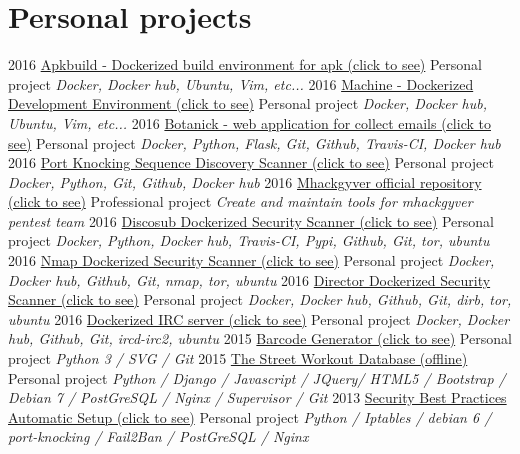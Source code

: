 \documentclass[]{friggeri-cv}
\begin{document}
\section{Personal projects}
\begin{entrylist}
  \entry
    {2016}
    {\href{https://github.com/gr0und-s3ct0r/apkbuild}{Apkbuild - Dockerized build environment for apk (click to see)}}
    {Personal project}
    {\emph{Docker, Docker hub, Ubuntu, Vim, etc...}}
  \entry
    {2016}
    {\href{https://github.com/4383/machine}{Machine - Dockerized Development Environment (click to see)}}
    {Personal project}
    {\emph{Docker, Docker hub, Ubuntu, Vim, etc...}}
  \entry
    {2016}
    {\href{https://github.com/4383/Botanick}{Botanick - web application for collect emails (click to see)}}
    {Personal project}
    {\emph{Docker, Python, Flask, Git, Github, Travis-CI, Docker hub}}
  \entry
    {2016}
    {\href{https://github.com/mhackgyver-squad/porno-king}{Port Knocking Sequence Discovery Scanner (click to see)}}
    {Personal project}
    {\emph{Docker, Python, Git, Github, Docker hub}}
  \entry
    {2016}
    {\href{https://github.com/mhackgyver-squad/mhackgyver}{Mhackgyver official repository (click to see)}}
    {Professional project}
    {\emph{Create and maintain tools for mhackgyver pentest team}}
  \entry
    {2016}
    {\href{https://hub.docker.com/r/4383/discosub}{Discosub Dockerized Security Scanner (click to see)}}
    {Personal project}
    {\emph{Docker, Python, Docker hub, Travis-CI, Pypi, Github, Git, tor, ubuntu}}
  \entry
    {2016}
    {\href{https://hub.docker.com/r/4383/system-service-footprint}{Nmap Dockerized Security Scanner (click to see)}}
    {Personal project}
    {\emph{Docker, Docker hub, Github, Git, nmap, tor, ubuntu}}
  \entry
    {2016}
    {\href{https://hub.docker.com/r/4383/director}{Director Dockerized Security Scanner (click to see)}}
    {Personal project}
    {\emph{Docker, Docker hub, Github, Git, dirb, tor, ubuntu}}
  \entry
    {2016}
    {\href{https://hub.docker.com/r/4383/irc-server}{Dockerized IRC server (click to see)}}
    {Personal project}
    {\emph{Docker, Docker hub, Github, Git, ircd-irc2, ubuntu}}
  \entry
    {2015}
    {\href{http://pypi.python.org/pypi/barcode-generator/0.1rc15}{Barcode Generator (click to see)}}
    {Personal project}
    {\emph{Python 3 / SVG / Git}}
  \entry
    {2015}
    {\href{https://github.com/4383/street-workout-database}{The Street Workout Database (offline)}}
    {Personal project}
    {\emph{Python / Django / Javascript / JQuery/ HTML5 / Bootstrap / Debian 7 / PostGreSQL / Nginx / Supervisor / Git}}
  \entry
    {2013}
    {\href{https://github.com/4383/fabric-debian/}{Security Best Practices Automatic Setup (click to see)}}
    {Personal project}
    {\emph{Python / Iptables /  debian 6 / port-knocking / Fail2Ban / PostGreSQL / Nginx}}
\end{entrylist}
\end{document}
